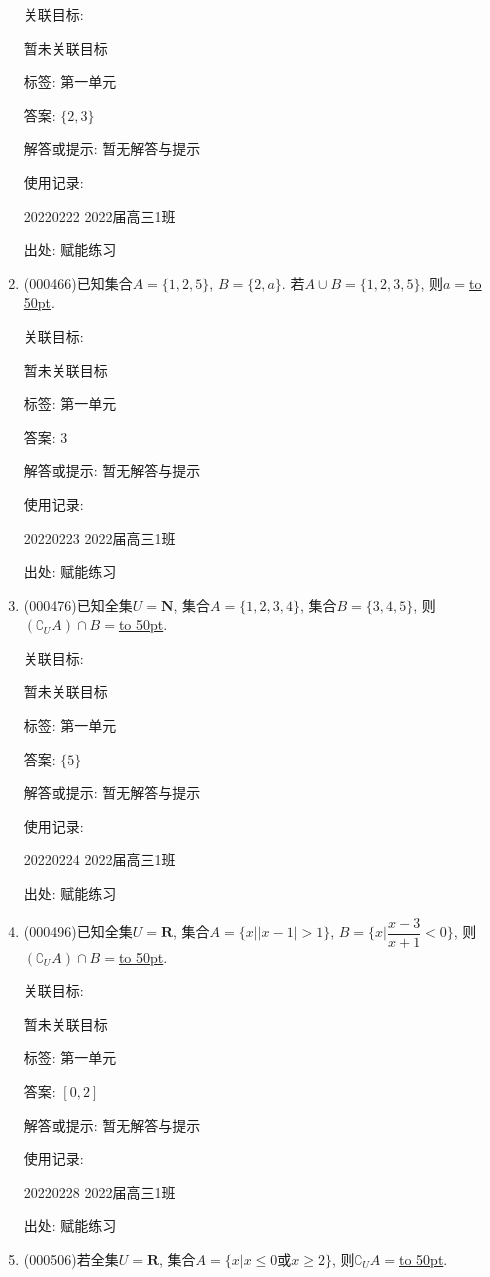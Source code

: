 \documentclass[10pt,a4paper]{article}
\newcommand{\blank}[1]{\underline{\hbox to #1pt{}}}
\begin{document}
\begin{enumerate}[1.]
关联目标:

暂未关联目标



标签: 第一单元

答案: $\{2,3\}$

解答或提示: 暂无解答与提示

使用记录:

20220222	2022届高三1班	


出处: 赋能练习
\item { (000466)}已知集合$A=\{1,2,5\}$, $B=\{2,a\}$. 若$A\cup B=\{1,2,3,5\}$, 则$a=$\blank{50}.


关联目标:

暂未关联目标



标签: 第一单元

答案: $3$

解答或提示: 暂无解答与提示

使用记录:

20220223	2022届高三1班	


出处: 赋能练习
\item { (000476)}已知全集$U=\mathbf{N}$, 集合$A=\{1,2,3,4\}$, 集合$B=\{3,4,5\}$, 则$(\complement_U A)\cap B=$\blank{50}.


关联目标:

暂未关联目标



标签: 第一单元

答案: $\{5\}$

解答或提示: 暂无解答与提示

使用记录:

20220224	2022届高三1班	


出处: 赋能练习
\item { (000496)}已知全集$U=\mathbf{R}$, 集合$A=\{x||x-1|>1\}$, $B=\{x|\dfrac{x-3}{x+1}<0\}$, 则$(\complement_U A)\cap B=$\blank{50}.


关联目标:

暂未关联目标



标签: 第一单元

答案: $[0,2]$

解答或提示: 暂无解答与提示

使用记录:

20220228	2022届高三1班	


出处: 赋能练习
\item { (000506)}若全集$U=\mathbf{R}$, 集合$A=\{x|x\le 0\text{或} x\ge 2\}$, 则$\complement_U A=$\blank{50}.



\end{enumerate}
\end{document}

